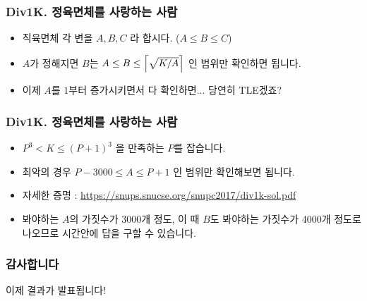 \documentclass[xetex]{beamer}
\DeclarePairedDelimiter\ceil{\lceil}{\rceil}
\begin{document}
\begin{frame}
  \frametitle{Div1K. 정육면체를 사랑하는 사람}
  \begin{itemize}
    \item 직육면체 각 변을 $A, B, C$ 라 합시다. ($A \le B \le C$)
    \item $A$가 정해지면 $B$는  $A \le B \le \ceil*{\sqrt{K/A}}$ 인 범위만 확인하면 됩니다.
    \item 이제 $A$를 $1$부터 증가시키면서 다 확인하면... 당연히 TLE겠죠?
  \end{itemize}
\end{frame}

\begin{frame}
  \frametitle{Div1K. 정육면체를 사랑하는 사람}
  \begin{itemize}
    \item $P^3 < K \le (P+1)^3$  을 만족하는 $P$를 잡습니다.
    \item 최악의 경우 $P - 3000 \le A \le P+1$ 인 범위만 확인해보면 됩니다.
    \item 자세한 증명 : \url{https://snups.snucse.org/snupc2017/div1k-sol.pdf}
    \item 봐야하는 $A$의 가짓수가 3000개 정도, 이 때 $B$도 봐야하는 가짓수가 4000개 정도로 나오므로 시간안에 답을 구할 수 있습니다.
  \end{itemize}
\end{frame}

\begin{frame}
  \frametitle{감사합니다}
  \begin{center}
    이제 결과가 발표됩니다!
  \end{center}
\end{frame}
\end{document}
